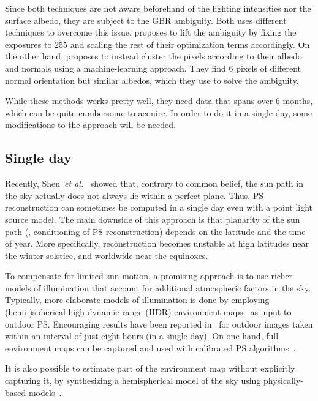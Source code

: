 Since both techniques are not aware beforehand of the lighting intensities nor the surface albedo, they are subject to the GBR ambiguity. Both uses different techniques to overcome this issue. \cite{abrams-eccv-12} proposes to lift the ambiguity by fixing the exposures to 255 and scaling the rest of their optimization terms accordingly. On the other hand, \cite{ackermann-cvpr-12} proposes to instead cluster the pixels according to their albedo and normals using a machine-learning approach. They find 6 pixels of different normal orientation but similar albedos, which they use to solve the ambiguity.

While these methods works pretty well, they need data that spans over 6 months, which can be quite cumbersome to acquire. In order to do it in a single day, some modifications to the approach will be needed.

\subsection{Single day}
Recently, Shen~{\em et al.}~\cite{shen-pg-14} showed that, contrary to common belief, the sun path in the sky actually does not always lie within a perfect plane. Thus, PS reconstruction can sometimes be computed in a single day even with a point light source model. The main downside of this approach is that planarity of the sun path (\ie, conditioning of PS reconstruction) depends on the latitude and the time of year. More specifically, reconstruction becomes unstable at high latitudes near the winter solstice, and worldwide near the equinoxes.

To compensate for limited sun motion, a promising approach is to use richer models of illumination that account for additional atmospheric factors in the sky. Typically, more elaborate models of illumination is done by employing (hemi-)spherical high dynamic range (HDR) environment maps~\cite{debevec-siggraph-98,reinhard-book-05} as input to outdoor PS. Encouraging results have been reported in~\cite{yu-iccp-13} for outdoor images taken within an interval of just eight hours (in a single day). On one hand, full environment maps can be captured and used with calibrated PS algorithms~\cite{yu-iccp-13,shi-3dv-14,hung-wacv-15}.


It is also possible to estimate part of the environment map without explicitly capturing it, by synthesizing a hemispherical model of the sky using physically-based models~\cite{inose-tcva-13,jung-cvpr-15}.

